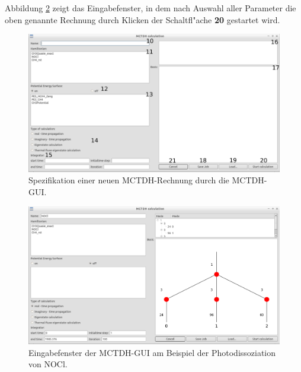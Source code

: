 Abbildung \ref{fig:workflow5} zeigt das Eingabefenster, in dem nach Auswahl aller Parameter die oben genannte Rechnung 
durch Klicken der Schaltfl"ache \textbf{20} gestartet wird.

\begin{figure}
    \centering
    \includegraphics[angle=90, scale=0.45]{figures/screenWidgetA}
    \caption{Spezifikation einer neuen MCTDH-Rechnung durch die MCTDH-GUI.}\label{fig:workflow4}
\end{figure}
\begin{figure}
    \centering
    \includegraphics[angle=90, scale=0.45]{figures/screenWidgetAexample}
    \caption{Eingabefenster der MCTDH-GUI am Beispiel der
    Photodissoziation von NOCl.}\label{fig:workflow5}
\end{figure}
